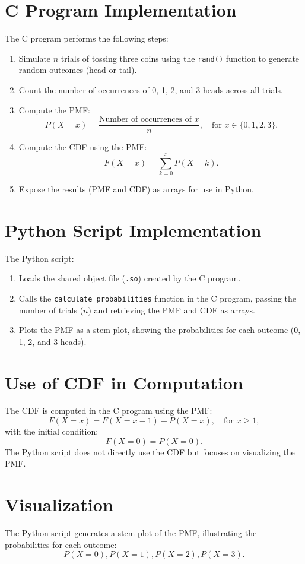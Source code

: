 \documentclass[journal]{IEEEtran}
\begin{document}
\begin{enumerate}
\section*{C Program Implementation}
The C program performs the following steps:
\begin{enumerate}
    \item Simulate \( n \) trials of tossing three coins using the \texttt{rand()} function to generate random outcomes (head or tail).
    \item Count the number of occurrences of 0, 1, 2, and 3 heads across all trials.
    \item Compute the PMF:
    \[
    P(X = x) = \frac{\text{Number of occurrences of } x}{n}, \quad \text{for } x \in \{0, 1, 2, 3\}.
    \]
    \item Compute the CDF using the PMF:
    \[
    F(X = x) = \sum_{k=0}^{x} P(X = k).
    \]
    \item Expose the results (PMF and CDF) as arrays for use in Python.
\end{enumerate}

\section*{Python Script Implementation}
The Python script:
\begin{enumerate}
    \item Loads the shared object file (\texttt{.so}) created by the C program.
    \item Calls the \texttt{calculate\_probabilities} function in the C program, passing the number of trials (\( n \)) and retrieving the PMF and CDF as arrays.
    \item Plots the PMF as a stem plot, showing the probabilities for each outcome (0, 1, 2, and 3 heads).
\end{enumerate}

\section*{Use of CDF in Computation}
The CDF is computed in the C program using the PMF:
\[
F(X = x) = F(X = x-1) + P(X = x), \quad \text{for } x \geq 1,
\]
with the initial condition:
\[
F(X = 0) = P(X = 0).
\]
The Python script does not directly use the CDF but focuses on visualizing the PMF.

\section*{Visualization}
The Python script generates a stem plot of the PMF, illustrating the probabilities for each outcome:
\[
P(X = 0), P(X = 1), P(X = 2), P(X = 3).
\]


\end{enumerate}
\end{document}
